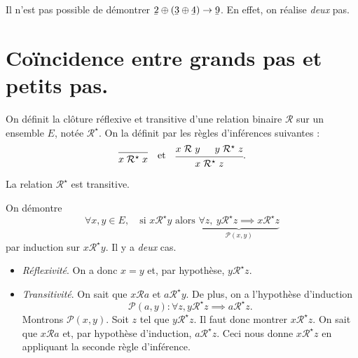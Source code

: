 \documentclass[../main]{subfiles}
\begin{document}
  \begin{rmk}
    Il n'est pas possible de démontrer $\ubar 2 \oplus (\ubar 3 \oplus \ubar 4) \to \ubar 9$.
    En effet, on réalise \textit{deux} pas.
  \end{rmk}

  \section{Coïncidence entre grands pas et petits pas.}

  On définit la clôture réflexive et transitive d'une relation binaire $\mathcal{R}$ sur un ensemble $E$, notée $\mathcal{R}^\star$.
  On la définit par les règles d'inférences suivantes :
  \[
  \begin{prooftree}
    \infer 0{x \mathrel{\mathcal{R}^\star} x}
  \end{prooftree}
  \quad\text{et}\quad
  \begin{prooftree}
    \hypo{x \mathrel{\mathcal{R}} y}
    \hypo{y \mathrel{\mathcal{R}^\star} z}
    \infer 2{x \mathrel{\mathcal{R}^\star} z}
  \end{prooftree}
  .\]

  \begin{lem}\label{lem:petit-pas-trans-transitif}
    La relation $\mathcal{R}^\star$ est transitive.
  \end{lem}
  \begin{prv}
    On démontre \[
      \forall x,y \in E, \quad \text{si } x \mathrel{\mathcal{R}^\star} y \text{ alors } \underbrace{\forall z, \ y \mathrel{\mathcal{R}^\star} z \implies x \mathrel{\mathcal{R}^\star} z}_{\mathcal{P}(x,y)}
    \] par induction sur $x \mathrel{\mathcal{R}^\star} y$.
    Il y a \textit{deux} cas.
    \begin{itemize}
      \item \textsl{Réflexivité}. On a donc $x = y$ et, par hypothèse, $y \mathrel{\mathcal{R}^\star} z$.
      \item \textsl{Transitivité}.
        On sait que $x \mathrel{\mathcal{R}} a$ et $a \mathrel{\mathcal{R}^\star} y$.
        De plus, on a l'hypothèse d'induction \[\mathcal{P}(a,y) : \forall z, y \mathrel{\mathcal{R}^\star} z \implies a \mathrel{\mathcal{R}^\star} z.\]
        Montrons $\mathcal{P}(x,y)$.
        Soit $z$ tel que $y \mathrel{\mathcal{R}^\star} z$. Il faut donc montrer $x \mathrel{\mathcal{R}^\star} z$.
        On sait que $x \mathrel{\mathcal{R}} a$ et, par hypothèse d'induction, $a \mathrel{\mathcal{R}^\star} z$.
        Ceci nous donne $x \mathrel{\mathcal{R}^\star} z$ en appliquant la seconde règle d'inférence.
    \end{itemize}
  \end{prv}
\end{document}
